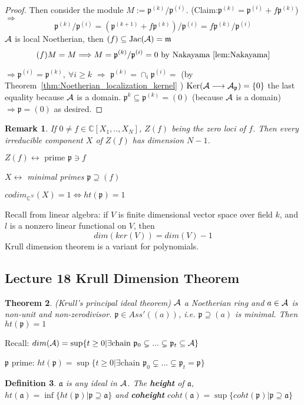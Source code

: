 \documentclass[11pt]{article}
\newtheorem{thm}{Theorem}[section]
\newtheorem{dfn}[thm]{Definition}
\newtheorem{rmk}[thm]{Remark}
\newcommand{\cplx}{\mathbb C}
\newcommand{\sca}{{\mathfrak a}}
\newcommand{\scm}{{\mathfrak m}}
\newcommand{\scp}{{\mathfrak p}}
\newcommand{\cala}{{\cal A}}
\newcommand{\Lrta}{\Longrightarrow}
\newcommand{\lrta}{\longrightarrow}
\newcommand{\llrta}{\longleftrightarrow}
\newcommand{\Llrta}{\Longleftrightarrow}
\begin{document}
\begin{proof}
Then consider the module $M:=\scp^{(k)}/\scp^{(i)}$.
(Claim:$\scp^{(k)}=\scp^{(i)}+f\scp^{(k)}$)$\Lrta$ 
$$
\scp^{(k)}/\scp^{(i)}=(\scp^{(k+1)}+f\scp^{(k)})/\scp^{(i)}=f\scp^{(k)}/\scp^{(i)}
$$
$\cala$ is local Noetherian, then
$(f)\subseteq \text{Jac}(\cala)=\scm$
$$
(f)M=M\Lrta M=\scp^{(k)}/\scp^{(i)}=0\text{ by Nakayama~\ref{lem:Nakayama}}
$$

$\Lrta\scp^{(i)}=\scp^{(k)},\ \forall i\geq k$ $\Lrta$ $\scp^{(k)}=\cap_i\scp^{(i)}=$ (by Theorem~\ref{thm:Noetherian_localization_kernel} ) $\text{Ker}(\cala\lrta \cala_\scp)=\{0\}$ the last equality because $\cala$ is a domain.
$\scp^k\subseteq\scp^{(k)}=(0)$ (because $\cala$ is a domain) $\Lrta\scp=(0)$ as desired.
\end{proof}

\begin{rmk}
If $0\neq f\in\cplx[X_1,..,X_N]$, $Z(f)$ being the zero loci of $f$. Then every irreducible component $X$ of $Z(f)$ has dimension $N-1$.

$Z(f)\llrta\text{ prime }\scp\ni f$

$X\llrta $ minimal primes $\scp\supseteq (f)$ 

$codim_{\cplx^N}(X)=1\Llrta ht(\scp)=1$
\end{rmk}

Recall from linear algebra:
if $V$ is finite dimensional vector space over field $k$, and $l$ is a nonzero linear functional on $V$, then
$$
dim(ker(V))=dim(V)-1
$$
Krull dimension theorem is a variant for polynomials.

\subsection{Lecture 18 Krull Dimension Theorem}
\begin{thm}\label{thm:krull_principal}
(Krull's principal ideal theorem) $\cala$ a Noetherian ring and $a\in \cala$ is non-unit and non-zerodivisor.
$\scp\in Ass'((a))$, i.e. $\scp\supseteq (a)$ is minimal. Then $ht(\scp)=1$
\end{thm}
Recall: $dim(\cala)=\sup\{t\geq 0|\exists \text{chain } \scp_0\subsetneq...\subsetneq \scp_t\subseteq \cala\}$

$\scp$ prime: $ht(\scp)=\sup\{t\geq 0|\exists \text{chain } \scp_0\subsetneq...\subsetneq \scp_t=\scp\}$
\begin{dfn}$\sca$ is any ideal in $\cala$. The \textbf{height} of $\sca$, $ht(\sca)=\inf\{ht(\scp)|\scp\supseteq\sca\}$
 and \textbf{coheight} $coht(\sca)=\sup\{coht(\scp)|\scp\supseteq \sca\}$
\end{dfn}
\end{document}
